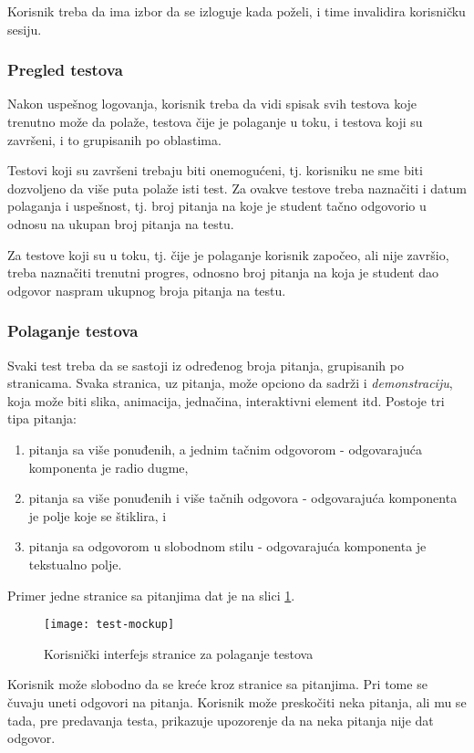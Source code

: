 Korisnik treba da ima izbor da se izloguje kada poželi, i time invalidira korisničku sesiju.

\subsubsection{Pregled testova}
Nakon uspešnog logovanja, korisnik treba da vidi spisak svih testova koje trenutno može da polaže, testova čije je polaganje u toku, i testova koji su završeni, i to grupisanih po oblastima.

Testovi koji su završeni trebaju biti onemogućeni, tj. korisniku ne sme biti dozvoljeno da više puta polaže isti test. Za ovakve testove treba naznačiti i datum polaganja i uspešnost, tj. broj pitanja na koje je student tačno odgovorio u odnosu na ukupan broj pitanja na testu.

Za testove koji su u toku, tj. čije je polaganje korisnik započeo, ali nije završio, treba naznačiti trenutni progres, odnosno broj pitanja na koja je student dao odgovor naspram ukupnog broja pitanja na testu.

\subsubsection{Polaganje testova}
Svaki test treba da se sastoji iz određenog broja pitanja, grupisanih po stranicama. Svaka stranica, uz pitanja, može opciono da sadrži i \emph{demonstraciju}, koja može biti slika, animacija, jednačina, interaktivni element itd. Postoje tri tipa pitanja:
\begin{enumerate}
\item pitanja sa više ponuđenih, a jednim tačnim odgovorom - odgovarajuća komponenta je radio dugme,
\item pitanja sa više ponuđenih i više tačnih odgovora - odgovarajuća komponenta je polje koje se štiklira, i
\item pitanja sa odgovorom u slobodnom stilu - odgovarajuća komponenta je tekstualno polje.
\end{enumerate}
Primer jedne stranice sa pitanjima dat je na slici \ref{fig:test-mockup}.
\begin{figure}[ht]
\centering
\texttt{[image: test-mockup]}
\caption{Korisnički interfejs stranice za polaganje testova}
\label{fig:test-mockup}
\end{figure}

Korisnik može slobodno da se kreće kroz stranice sa pitanjima. Pri tome se čuvaju uneti odgovori na pitanja. Korisnik može preskočiti neka pitanja, ali mu se tada, pre predavanja testa, prikazuje upozorenje da na neka pitanja nije dat odgovor.

